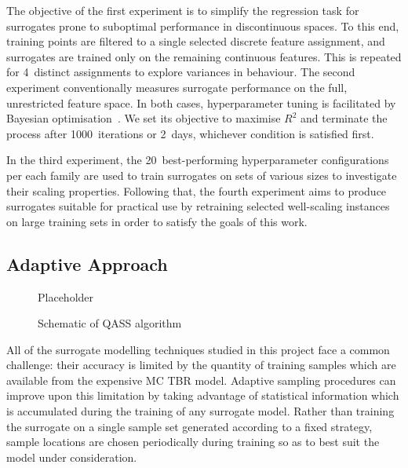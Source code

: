 The objective of the first experiment is to simplify the regression task for
surrogates prone to suboptimal performance in discontinuous spaces.
To this end, training points are filtered to a single selected discrete feature
assignment, and surrogates are trained only on the remaining continuous features.
This is repeated for 4~distinct assignments to explore variances in behaviour.
The second experiment conventionally measures surrogate performance on the full,
unrestricted feature space. In both cases, hyperparameter tuning is
facilitated by Bayesian optimisation~\cite{movckus1975bayesian}. We set its
objective to maximise $R^2$ and terminate the process after 1000~iterations or
2~days, whichever condition is satisfied first.

In the third experiment, the 20~best-performing hyperparameter configurations
per each family are used to train surrogates on sets of various sizes to
investigate their scaling properties. Following that, the fourth experiment aims
to produce surrogates suitable for practical use by retraining selected
well-scaling instances on large training sets in order to satisfy the goals of this work.


\subsection{Adaptive Approach}\label{sec:adaptive}

\begin{figure}[h]
	\centering
	Placeholder %
	\caption{Schematic of QASS algorithm}
	\label{fig:qassplan}
\end{figure}

All of the surrogate modelling techniques studied in this project face a common
challenge: their accuracy is limited by the quantity of training samples which
are available from the expensive MC TBR model. Adaptive sampling procedures can
improve upon this limitation by taking advantage of statistical information
which is accumulated during the training of any surrogate model. Rather than
training the surrogate on a single sample set generated according to a fixed
strategy, sample locations are chosen periodically during training so as to best suit the model
under consideration.

